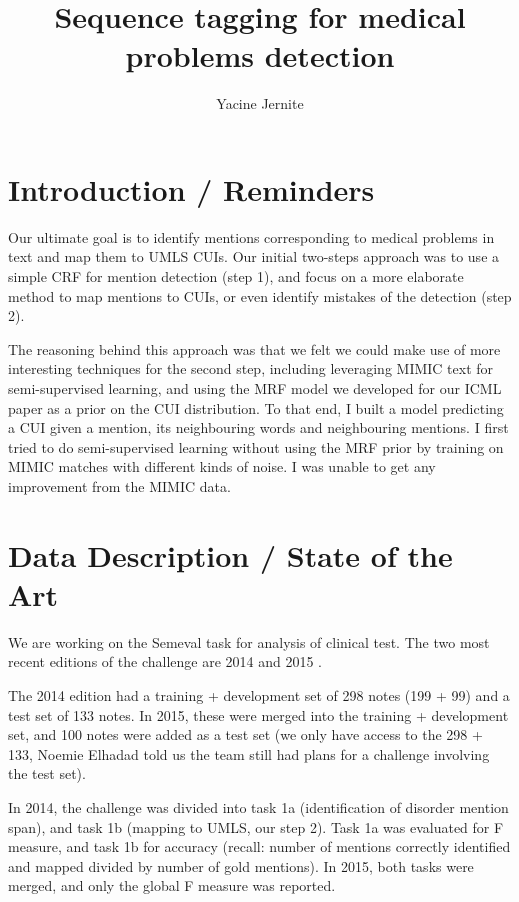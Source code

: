 \documentclass[10pt,a4paper]{article}
\author{Yacine Jernite}
\title{Sequence tagging for medical problems detection}
\begin{document}
\maketitle

\section{Introduction / Reminders}

  Our ultimate goal is to identify mentions corresponding to medical problems in text and map them to UMLS CUIs. Our initial two-steps approach was to use a simple CRF for mention detection (step 1), and focus on a more elaborate method to map mentions to CUIs, or even identify mistakes of the detection (step 2).

  The reasoning behind this approach was that we felt we could make use of more interesting techniques for the second step, including leveraging MIMIC text for semi-supervised learning, and using the MRF model we developed for our ICML paper as a prior on the CUI distribution. To that end, I built a model predicting a CUI given a mention, its neighbouring words and neighbouring mentions. I first tried to do semi-supervised learning without using the MRF prior by training on MIMIC matches with different kinds of noise. I was unable to get any improvement from the MIMIC data. 

\section{Data Description / State of the Art}

  We are working on the Semeval task for analysis of clinical test. The two most recent editions of the challenge are 2014 \cite{pradhan2014semeval} and 2015 \cite{elhadad298semeval}.
  
  The 2014 edition had a training + development set of 298 notes (199 + 99) and a test set of 133 notes. In 2015, these were merged into the training + development set, and 100 notes were added as a test set (we only have access to the 298 + 133, Noemie Elhadad told us the team still had plans for a challenge involving the test set).
  
  In 2014, the challenge was divided into task 1a (identification of disorder mention span), and task 1b (mapping to UMLS, our step 2). Task 1a was evaluated for F measure, and task 1b for accuracy (recall: number of mentions correctly identified and mapped divided by number of gold mentions). In 2015, both tasks were merged, and only the global F measure was reported.
\end{document}
